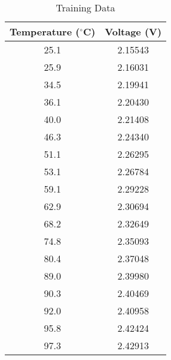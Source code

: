 \documentclass{article}
\begin{document}


\begin{table}[h]
\centering
\caption{Training Data}
\label{tab:training_data}
\begin{tabular}{|c|c|}
\hline
\textbf{Temperature ($^{\circ}$C)} & \textbf{Voltage (V)} \\
\hline
25.1 & 2.15543 \\
\hline
25.9 & 2.16031 \\
\hline
34.5 & 2.19941 \\
\hline
36.1 & 2.20430 \\
\hline
40.0 & 2.21408 \\
\hline
46.3 & 2.24340 \\
\hline
51.1 & 2.26295 \\
\hline
53.1 & 2.26784 \\
\hline
59.1 & 2.29228 \\
\hline
62.9 & 2.30694 \\
\hline
68.2 & 2.32649 \\
\hline
74.8 & 2.35093 \\
\hline
80.4 & 2.37048 \\
\hline
89.0 & 2.39980 \\
\hline
90.3 & 2.40469 \\
\hline
92.0 & 2.40958 \\
\hline
95.8 & 2.42424 \\
\hline
97.3 & 2.42913 \\
\hline
\end{tabular}
\end{table}
\end{document}
